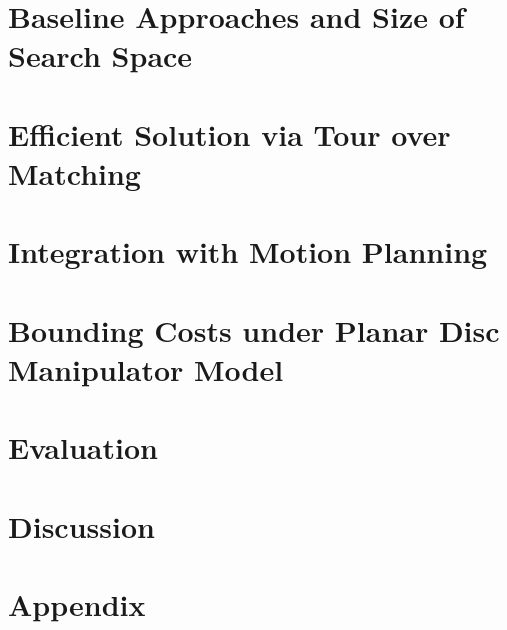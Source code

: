 \documentclass[journal]{IEEEtran}
\begin{document}
\section{Baseline Approaches and Size of Search Space}
\label{sec:baseline}


\section{Efficient Solution via Tour over Matching}
\label{sec:approximation}


\section{Integration with Motion Planning}
\label{sec:integration}


\section{Bounding Costs under Planar Disc Manipulator Model}
\label{sec:cost_bounds}


\section{Evaluation}
\label{sec:evaluation}


\section{Discussion}
\label{sec:discussion}


%
% 

 


\section{Appendix}
\label{sec:appendix}

\end{document}
